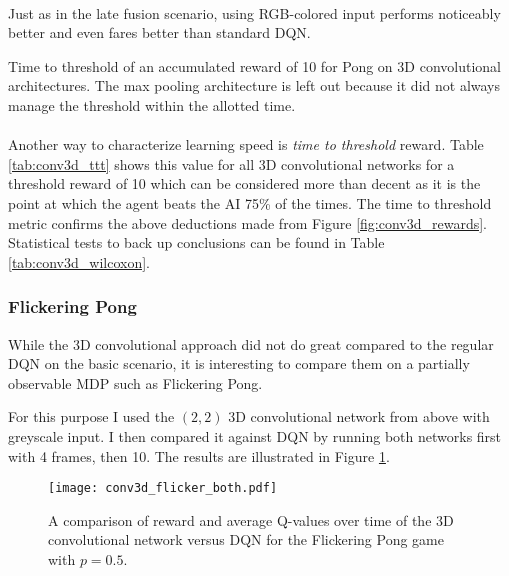 \paragraph{}
Just as in the late fusion scenario,
using RGB-colored input performs noticeably better
and even fares better than standard DQN.

\begin{table}
  \center
  \renewcommand{\arraystretch}{1.3}
  
  \caption{
    Time to threshold
    of an accumulated reward of 10
    for Pong
    on 3D convolutional architectures.
    The max pooling architecture is left out
    because it did not always manage the threshold
    within the allotted time.
  }
  \label{tab:conv3d_ttt}
\end{table}

\paragraph{}
Another way to characterize learning speed is
\textit{time to threshold} reward.
Table \ref{tab:conv3d_ttt}
shows this value for all 3D convolutional networks
for a threshold reward of 10
which can be considered more than decent
as it is the point at which
the agent beats the AI
75\% of the times.
The time to threshold metric
confirms the above deductions made
from Figure \ref{fig:conv3d_rewards}.
Statistical tests to back up conclusions
can be found in Table \ref{tab:conv3d_wilcoxon}.

\subsubsection{Flickering Pong}
While the 3D convolutional approach
did not do great compared to the regular DQN
on the basic scenario,
it is interesting to compare them
on a partially observable MDP
such as Flickering Pong.

For this purpose I used the $(2,2)$ 3D convolutional network from above
with greyscale input.
I then compared it against DQN by running both
networks first with 4 frames, then 10.
The results are illustrated in Figure \ref{fig:conv3d_flicker_both}.

\begin{figure}[htpb]
  \centering
  \texttt{[image: conv3d\_flicker\_both.pdf]}
  \caption{
    A comparison
    of reward and average Q-values over time
    of the 3D convolutional network versus DQN
    for the Flickering Pong game with $p=0.5$.
  }
  \label{fig:conv3d_flicker_both}
\end{figure}

